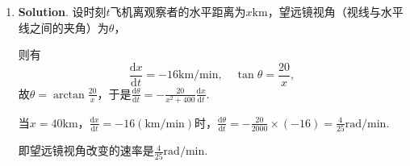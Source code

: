 \documentclass[../main.tex]{subfiles}
\begin{document}
\begin{enumerate}
          当$x=0$时，
          \[
              \begin{aligned}
                  f'(0)= {} & \lim_{x\to0}\frac{\frac{g(x)-\mathrm{e}^{-x}}{x}-0}{x}=\lim_{x\to0}\frac{g(x)-\mathrm{e}^{-x}}{x^2}=\lim_{x\to0}\frac{g'(x)+\mathrm{e}^{-x}}{2x} \\
                  = {}      & \lim_{x\to0}\frac{g'(x)+1+\mathrm{e}^{-x}-1}{2x}=\lim_{x\to0}\frac{g'(x)-g'(0)+\mathrm{e}^{-x}-1}{2x}=\frac{1}{2}(g''(0)-1),
              \end{aligned}
          \]
          因
          \[
              \begin{aligned}
                  \lim_{x\to 0}f'(x)= {} & \lim_{x\to0}\frac{x(g'(x)+\mathrm{e}^{-x})-(g(x)-\mathrm{e}^{-x})}{x^2}=\lim_{x\to0}\left(\frac{g'(x)+\mathrm{e}^{-x}}{x}-\frac{g(x)-\mathrm{e}^{-x}}{x^2}\right) \\
                  = {}                   & \lim_{x\to0}\frac{g'(x)+\mathrm{e}^{-x}}{x}-\lim_{x\to0}\frac{g(x)-\mathrm{e}^{-x}}{x^2}                                                  \\
                  = {}                   & g''(0)-1-\frac{1}{2}(g''(0)-1)=\frac{1}{2}(g''(0)-1)=f'(0),
              \end{aligned}
          \]
          故$f'(x)$在$x=0$处连续.

    \item \textbf{Solution}. 设时刻$t$飞机离观察者的水平距离为$x\mathrm{km}$，望远镜视角（视线与水平线之间的夹角）为$\theta$，
    
    则有
          \[
              \frac{\mathrm{d}x}{\mathrm{d}t}=-16\mathrm{km/min},\quad \tan\theta=\frac{20}{x},
          \]
          故$\theta=\arctan\frac{20}{x}$，于是$\frac{\mathrm{d}\theta}{\mathrm{d}t}=-\frac{20}{x^{2}+400}
              \frac{\mathrm{d}x}{\mathrm{d}t}$.

          当$x=40\mathrm{km}$，$\frac{\mathrm{d}x}{\mathrm{d}t}=-16(\mathrm{km/min})$时，$\frac{\mathrm{d}\theta}{\mathrm{d}t}
              =-\frac{20}{2000}\times(-16)=\frac{4}{25}\mathrm{rad/min}$.

          即望远镜视角改变的速率是$\frac{4}{25}\mathrm{rad/min}$.
\end{enumerate}
\end{document}
